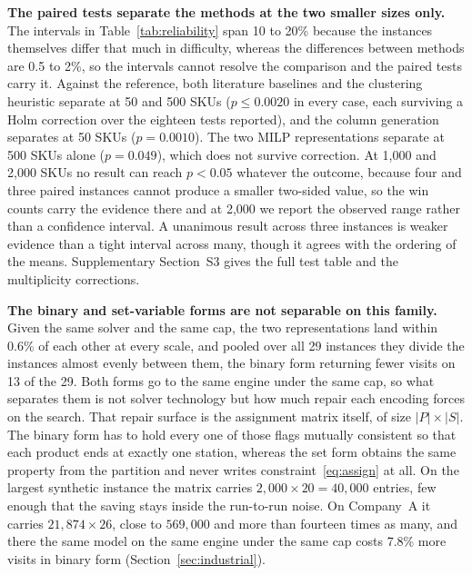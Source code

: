 \documentclass[]{interact}
\begin{document}
\textbf{The paired tests separate the methods at the two smaller sizes only.} The intervals in Table~\ref{tab:reliability} span 10 to 20\% because the instances themselves differ that much in difficulty, whereas the differences between methods are 0.5 to 2\%, so the intervals cannot resolve the comparison and the paired tests carry it. Against the reference, both literature baselines and the clustering heuristic separate at 50 and 500 SKUs ($p \le 0.0020$ in every case, each surviving a Holm correction over the eighteen tests reported), and the column generation separates at 50 SKUs ($p = 0.0010$). The two MILP representations separate at 500 SKUs alone ($p = 0.049$), which does not survive correction. At 1{,}000 and 2{,}000 SKUs no result can reach $p < 0.05$ whatever the outcome, because four and three paired instances cannot produce a smaller two-sided value, so the win counts carry the evidence there and at 2{,}000 we report the observed range rather than a confidence interval. A unanimous result across three instances is weaker evidence than a tight interval across many, though it agrees with the ordering of the means. Supplementary Section~S3 gives the full test table and the multiplicity corrections.

\textbf{The binary and set-variable forms are not separable on this family.} Given the same solver and the same cap, the two representations land within 0.6\% of each other at every scale, and pooled over all 29 instances they divide the instances almost evenly between them, the binary form returning fewer visits on 13 of the 29. Both forms go to the same engine under the same cap, so what separates them is not solver technology but how much repair each encoding forces on the search. That repair surface is the assignment matrix itself, of size $|P| \times |S|$. The binary form has to hold every one of those flags mutually consistent so that each product ends at exactly one station, whereas the set form obtains the same property from the partition and never writes constraint~\eqref{eq:assign} at all. On the largest synthetic instance the matrix carries $2{,}000 \times 20 = 40{,}000$ entries, few enough that the saving stays inside the run-to-run noise. On Company~A it carries $21{,}874 \times 26$, close to $569{,}000$ and more than fourteen times as many, and there the same model on the same engine under the same cap costs 7.8\% more visits in binary form (Section~\ref{sec:industrial}).
\end{document}
